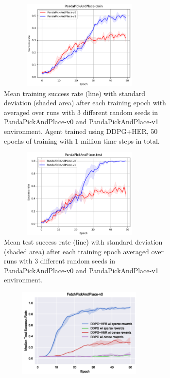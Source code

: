\documentclass[conference]{IEEEtran}
\begin{document}
\begin{figure}[ht]
\centering
\begin{subfigure}[t]{0.30\textwidth}
\centering
\includegraphics[width=0.9\textwidth, height=4.5cm]{img/exp_deep_train.png}
\caption{Mean training success rate (line) with standard deviation (shaded area) after each training epoch with averaged over runs with 3 different random seeds in PandaPickAndPlace-v0 and PandaPickAndPlace-v1 environment. Agent trained using DDPG+HER, 50 epochs of training with 1 million time steps in total.}
\label{fig:exp_deep_train}
\end{subfigure}
\hspace{1em}
\begin{subfigure}[t]{0.30\textwidth}
\centering
\includegraphics[width=0.9\textwidth, height=4.5cm]{img/exp_deep_test.png}
\caption{Mean test success rate (line) with standard deviation (shaded area) after each training epoch averaged over runs with 3 different random seeds in PandaPickAndPlace-v0 and PandaPickAndPlace-v1 environment.}
\label{fig:exp_deep_test}
\end{subfigure}
\hspace{1em}
\begin{subfigure}[t]{0.30\textwidth}
\centering
\includegraphics[width=0.9\textwidth, height=4.5cm]{img/exp_deep_test_plappert.png}

\end{subfigure}
\end{figure}
\end{document}
